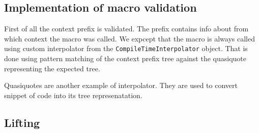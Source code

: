 \subsection{Implementation of macro validation}
First of all the context prefix is validated. The prefix contains info about from which context the macro was called. We expcept that the macro is always called using custom interpolator from the \texttt{CompileTimeInterpolator} object. That is done using pattern matching of the context prefix tree against the quasiquote representing the expected tree.

Quasiquotes are another example of interpolator. They are used to convert snippet of code into its tree represenatation.\cite{quasiquotes}

\subsection{Lifting}

